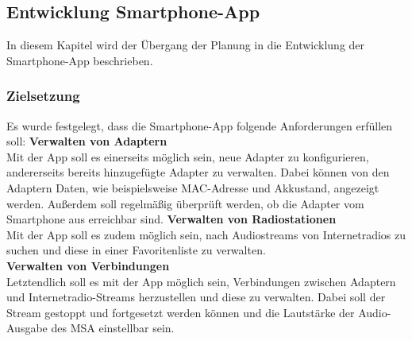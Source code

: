 \documentclass[11pt, twoside]{article}
\begin{document}
\subsection{Entwicklung Smartphone-App}
In diesem Kapitel wird der Übergang der Planung in die Entwicklung der Smartphone-App beschrieben.
\subsubsection{Zielsetzung}
Es wurde festgelegt, dass die Smartphone-App folgende Anforderungen erfüllen soll:
\vspace{4mm}\newline 
\textbf{Verwalten von Adaptern}  \\
Mit der App soll es einerseits möglich sein, neue Adapter zu konfigurieren, andererseits bereits hinzugefügte Adapter zu verwalten. Dabei können von den Adaptern Daten, wie beispielsweise MAC-Adresse und Akkustand, angezeigt werden. Außerdem soll regelmäßig überprüft werden, ob die Adapter vom Smartphone aus erreichbar sind.
\vspace{4mm}\newline
\textbf{Verwalten von Radiostationen} \\
Mit der App soll es zudem möglich sein, nach Audiostreams von Internetradios zu suchen und diese in einer Favoritenliste zu verwalten. \newline \\
\textbf{Verwalten von Verbindungen} \\
Letztendlich soll es mit der App möglich sein, Verbindungen zwischen Adaptern und Internetradio-Streams herzustellen und diese zu verwalten. Dabei soll der Stream gestoppt und fortgesetzt werden können und die Lautstärke der Audio-Ausgabe des MSA einstellbar sein.
\end{document}

